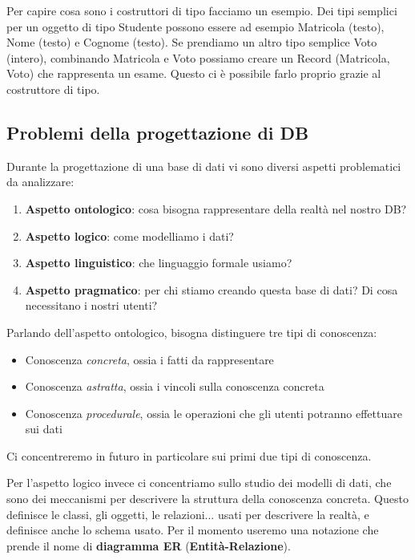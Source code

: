 \documentclass[11pt, a4paper, titlepage, oneside]{scrbook}
\begin{document}
Per capire cosa sono i costruttori di tipo facciamo un esempio. Dei tipi semplici per un oggetto di tipo Studente possono essere ad esempio Matricola (testo), Nome (testo) e Cognome (testo). Se prendiamo un altro tipo semplice Voto (intero), combinando Matricola e Voto possiamo creare un Record (Matricola, Voto) che rappresenta un esame. Questo ci è possibile farlo proprio grazie al costruttore di tipo. 

\subsection{Problemi della progettazione di DB}

Durante la progettazione di una base di dati vi sono diversi aspetti problematici da analizzare:
\begin{enumerate}
    \item \textbf{Aspetto ontologico}: cosa bisogna rappresentare della realtà nel nostro DB?
    \item \textbf{Aspetto logico}: come modelliamo i dati?
    \item \textbf{Aspetto linguistico}: che linguaggio formale usiamo?
    \item \textbf{Aspetto pragmatico}: per chi stiamo creando questa base di dati? Di cosa necessitano i nostri utenti?
\end{enumerate}

Parlando dell'aspetto ontologico, bisogna distinguere tre tipi di conoscenza:
\begin{itemize}
    \item Conoscenza \textit{concreta}, ossia i fatti da rappresentare
    \item Conoscenza \textit{astratta}, ossia i vincoli sulla conoscenza concreta
    \item Conoscenza \textit{procedurale}, ossia le operazioni che gli utenti potranno effettuare sui dati
\end{itemize}

Ci concentreremo in futuro in particolare sui primi due tipi di conoscenza.

Per l'aspetto logico invece ci concentriamo sullo studio dei modelli di dati, che sono dei meccanismi per descrivere la struttura della conoscenza concreta. Questo definisce le classi, gli oggetti, le relazioni... usati per descrivere la realtà, e definisce anche lo schema usato. Per il momento useremo una notazione che prende il nome di \textbf{diagramma ER} (\textbf{Entità-Relazione}).
\end{document}
